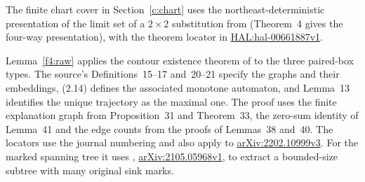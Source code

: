 The finite chart cover in Section~\ref{c:chart} uses the northeast-deterministic presentation of the limit set of a \(2\times2\) substitution from \cite[Theorem~3]{LGO2012} (Theorem~4 gives the four-way presentation), with the theorem locator in \href{https://hal.science/hal-00661887v1}{HAL:hal-00661887v1}.

Lemma~\ref{f4:raw} applies the contour existence theorem of \cite[Theorem~22]{SST2026} to the three paired-box types. The source's Definitions~15\nobreakdash--17 and~20\nobreakdash--21 specify the graphs and their embeddings, (2.14) defines the associated monotone automaton, and Lemma~13 identifies the unique trajectory as the maximal one. The proof uses the finite explanation graph from Proposition~31 and Theorem~33, the zero-sum identity of Lemma~41 and the edge counts from the proofs of Lemmas~38 and~40. The locators use the journal numbering and also apply to \href{https://arxiv.org/abs/2202.10999v3}{arXiv:2202.10999v3}. For the marked spanning tree it uses \mbox{\cite[Definition~2.4, Lemma~2.5 and Theorem~2 (Tree Separator)]{Gacs2021}}, \href{https://arxiv.org/abs/2105.05968v1}{arXiv:2105.05968v1}, to extract a bounded-size subtree with many original sink marks.

